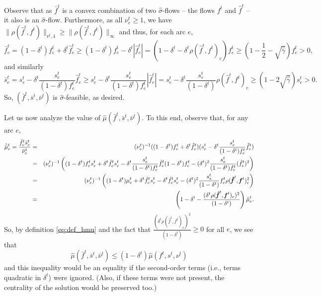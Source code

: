 \documentclass[11pt, letterpaper]{article}
\newcommand{\norm}[2]{\|#1\|_{#2}}
\newcommand{\inorm}[1]{\|#1\|_{\infty}}
\newcommand{\hf}{\hat{f}}
\newcommand{\of}{\bar{f}}
\newcommand{\os}{\bar{s}}
\newcommand{\onu}{\bar{\nu}}
\newcommand{\hmu}{\hat{\mu}}
\newcommand{\ohmu}{\hat{\bar{\mu}}}
\newcommand{\hgamma}{\hat{\gamma}}
\newcommand{\vrho}{\boldsymbol{\mathit{\rho}}}
\newcommand{\vnu}{\boldsymbol{\mathit{\nu}}}
\newcommand{\ovnu}{\boldsymbol{\bar{\mathit{\nu}}}}
\newcommand{\hvsigma}{\boldsymbol{\mathit{\hat{\sigma}}}}
\newcommand{\ff}{\boldsymbol{\mathit{f}}}
\newcommand{\off}{\boldsymbol{\mathit{\bar{f}}}}
\newcommand{\hff}{\boldsymbol{\mathit{\hat{f}}}}
\renewcommand{\ss}{\boldsymbol{\mathit{s}}}
\newcommand{\oss}{\boldsymbol{\bar{\mathit{s}}}}
\begin{document}
Observe that as $\off^t$ is a convex combination of two $\hvsigma$-flows -- the flows $\ff^t$ and $\hff^t$ -- it also is an $\hvsigma$-flow.  Furthermore, as all $\nu_e^t\geq 1$, we have $\norm{\vrho(\hff^t,\ff^t)}{\vnu^t,4}\geq \inorm{\vrho(\hff^t,\ff^t)}$ and thus, for each arc $e$,
\begin{equation}
\label{eq:interior_bound_2}
\of_e^t  =  (1-\delta^t) f_e^t + \delta^t \hf_e^t \geq (1-\delta^t) f_e^t - \delta^t |\hf_e^t| =  (1-\delta^t - \delta^t \rho(\hff^t,\ff^t)_e) f_e^t \geq (1-\frac{1}{2}-\sqrt{\hgamma})f_e^t>0,
\end{equation}
and similarly
\[
\os_e^t = s_e^t - \delta^t \frac{s_e^t}{(1-\delta^t)f_e^t} \hf_e^t \geq s_e^t - \delta^t \frac{s_e^t}{(1-\delta^t)f_e^t} |\hf_e^t| = s_e^t - \delta^t \frac{s_e^t}{(1-\delta^t)} \rho(\hff^t,\ff^t)_e \geq (1-2\sqrt{\hgamma})s_e^t>0.
\]
So, $(\off^t,\oss^t,\ovnu^t)$ is $\hvsigma$-feasible, as desired.

Let us now analyze the value of $\hmu(\off^t,\oss^t,\ovnu^t)$. To this end, observe that, for any arc $e$,
\begin{eqnarray}
\ohmu_e^t =\frac{\of^t_e \os_e^t}{\onu^t_e} & = & (\nu_e^t)^{-1}((1-\delta^t) f_e^t + \delta^t \hf_e^t)(s_e^t - \delta^t \frac{s_e^t}{(1-\delta^t)f_e^t} \hf_e^t)\notag\\
&=& (\nu_e^t)^{-1}\left((1-\delta^t)f_e^ts_e^t +  \delta^t \hf_e^t s_e^t - \delta^t \frac{s_e^t}{(1-\delta^t)f_e^t} \hf_e^t (1-\delta^t) f_e^t - (\delta^t)^2 \frac{s_e^t}{(1-\delta^t)f_e^t}(\hf_e^t)^2\right) \notag\\
&=& (\nu_e^t)^{-1}\left((1-\delta^t) \mu_e^t + \delta^t \hf_e^t s_e^t - \delta^t \hf_e^t s_e^t - (\delta^t)^2 \frac{s_e^t}{(1-\delta^t)} f_e^t \rho(\hff^t,\ff^t)_e^2\right)\label{eq:duality_change}\\
&=& \left(1-\delta^t- \frac{(\delta^t\rho(\hff^t,\ff^t)_e)^2}{(1-\delta^t)}\right) \hmu_e^t.\notag
\end{eqnarray}
So, by definition \eqref{eq:def_hmu} and the fact that $\frac{(\delta^t\rho(\hff^t,\ff^t)_e)^2}{(1-\delta^t)}\geq 0$ for all $e$, we see that 
\[
\hmu(\off^t,\oss^t,\ovnu^t)\leq (1-\delta^t) \hmu(\ff^{t},\ss^{t},\vnu^{t})
\]
and this inequality would be an equality if the second-order terms (i.e., terms quadratic in $\delta^t$) were ignored. (Also, if these terms were not present, the centrality of the solution would be preserved too.)
\end{document}
